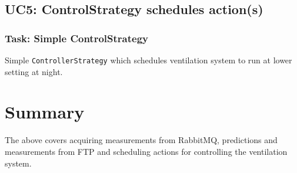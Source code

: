 \subsection*{UC5: ControlStrategy schedules action(s)}
\subsubsection{Task: Simple ControlStrategy}
Simple \texttt{ControllerStrategy} which schedules ventilation system to run at lower setting at night.


\section{Summary}
The above covers acquiring measurements from RabbitMQ, predictions and measurements from FTP and scheduling actions for controlling the ventilation system.


